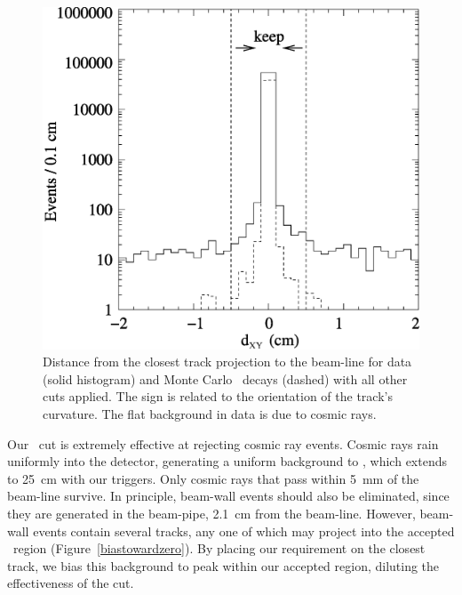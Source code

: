 \documentclass{cornell}
\begin{document}
\begin{figure}[p]
  \begin{center}
    \includegraphics[width=\linewidth]{dxy}
  \end{center}
  \caption[Distribution of the closest track projection to the
  beam-line]{\label{dxy} Distance from the closest track projection to
  the beam-line for data (solid histogram) and Monte Carlo \ups\
  decays (dashed) with all other cuts applied.  The sign is related to
  the orientation of the track's curvature.  The flat background in
  data is due to cosmic rays.}
\end{figure}

Our \dxy\ cut is extremely effective at rejecting cosmic ray events.
Cosmic rays rain uniformly into the detector, generating a uniform
background to \dxy, which extends to 25~cm with our triggers.  Only
cosmic rays that pass within 5~mm of the beam-line survive.  In
principle, beam-wall events should also be eliminated, since they are
generated in the beam-pipe, 2.1~cm from the beam-line.  However,
beam-wall events contain several tracks, any one of which may project
into the accepted \dxy\ region (Figure~\ref{biastowardzero}).  By
placing our requirement on the closest track, we bias this background
to peak within our accepted region, diluting the effectiveness of the
cut.
\end{document}
